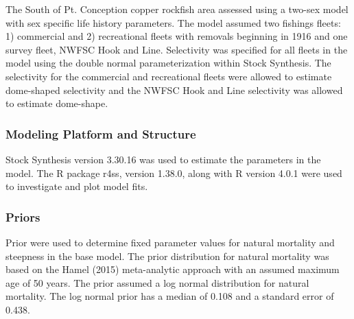 \documentclass[11pt,
  english,
  a4paper,
]{article}
\begin{document}
The South of Pt. Conception copper rockfish area assessed using a two-sex model with sex specific life history parameters. The model assumed two fishings fleets: 1) commercial and 2) recreational fleets with removals beginning in 1916 and one survey fleet, NWFSC Hook and Line. Selectivity was specified for all fleets in the model using the double normal parameterization within Stock Synthesis. The selectivity for the commercial and recreational fleets were allowed to estimate dome-shaped selectivity and the NWFSC Hook and Line selectivity was allowed to estimate dome-shape.

\leavevmode\tagmcend\tagstructend\par


\hypertarget{modeling-platform-and-structure}{%
\subsubsection{Modeling Platform and Structure}\label{modeling-platform-and-structure}}

\leavevmode\tagmcend\tagstructend


Stock Synthesis version 3.30.16 was used to estimate the parameters in the model. The R package r4ss, version 1.38.0, along with R version 4.0.1 were used to investigate and plot model fits.

\leavevmode\tagmcend\tagstructend\par


\hypertarget{priors}{%
\subsubsection{Priors}\label{priors}}

\leavevmode\tagmcend\tagstructend


Prior were used to determine fixed parameter values for natural mortality and steepness in the base model. The prior distribution for natural mortality was based on the Hamel {(2015)\leavevmode\tagmcend\tagstructend} meta-analytic approach with an assumed maximum age of 50 years. The prior assumed a log normal distribution for natural mortality. The log normal prior has a median of 0.108 and a standard error of 0.438.
\end{document}
